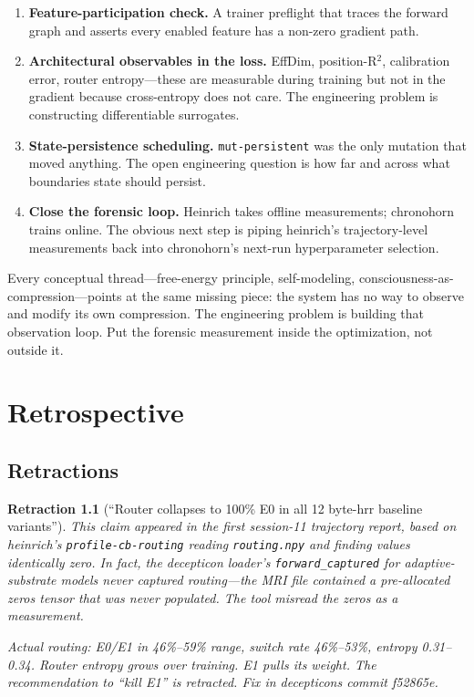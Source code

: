 \documentclass[11pt,openany]{book}
\newtheorem{retraction}{Retraction}[chapter]
\begin{document}
\begin{enumerate}
  \item \textbf{Feature-participation check.} A trainer preflight that
  traces the forward graph and asserts every enabled feature has a
  non-zero gradient path.
  \item \textbf{Architectural observables in the loss.} EffDim,
  position-R$^2$, calibration error, router entropy---these are
  measurable during training but not in the gradient because
  cross-entropy does not care. The engineering problem is constructing
  differentiable surrogates.
  \item \textbf{State-persistence scheduling.} \texttt{mut-persistent}
  was the only mutation that moved anything. The open engineering
  question is how far and across what boundaries state should persist.
  \item \textbf{Close the forensic loop.} Heinrich takes offline
  measurements; chronohorn trains online. The obvious next step is
  piping heinrich's trajectory-level measurements back into
  chronohorn's next-run hyperparameter selection.
\end{enumerate}

Every conceptual thread---free-energy principle, self-modeling,
consciousness-as-compression---points at the same missing piece: the
system has no way to observe and modify its own compression. The
engineering problem is building that observation loop. Put the
forensic measurement inside the optimization, not outside it.

\part{Retrospective}

\chapter{Retractions}

\begin{retraction}[``Router collapses to 100\% E0 in all 12 byte-hrr
baseline variants'']
This claim appeared in the first session-11 trajectory report, based
on heinrich's \texttt{profile-cb-routing} reading
\texttt{routing.npy} and finding values identically zero. In fact, the
decepticon loader's \texttt{forward\_captured} for adaptive-substrate
models never captured routing---the MRI file contained a
pre-allocated zeros tensor that was never populated. The tool misread
the zeros as a measurement.

Actual routing: E0/E1 in 46\%--59\% range, switch rate 46\%--53\%,
entropy 0.31--0.34. Router entropy \emph{grows} over training. E1
pulls its weight. The recommendation to ``kill E1'' is retracted.
Fix in decepticons commit f52865e.
\end{retraction}
\end{document}
